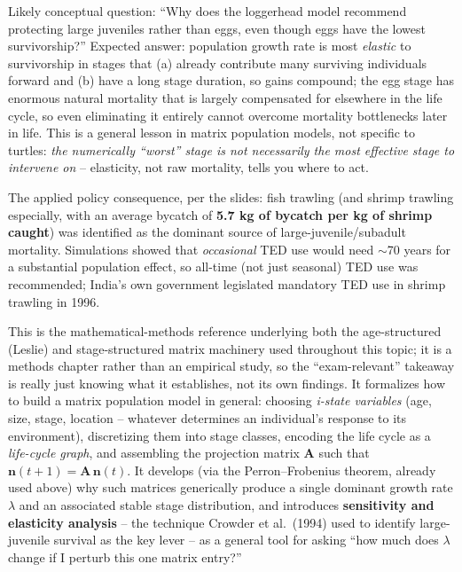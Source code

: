 \documentclass[11pt,a4paper]{article}
\begin{document}
\begin{exambox}
Likely conceptual question: ``Why does the loggerhead model recommend protecting large juveniles rather than eggs, even though eggs have the lowest survivorship?'' Expected answer: population growth rate is most \emph{elastic} to survivorship in stages that (a) already contribute many surviving individuals forward and (b) have a long stage duration, so gains compound; the egg stage has enormous natural mortality that is largely compensated for elsewhere in the life cycle, so even eliminating it entirely cannot overcome mortality bottlenecks later in life. This is a general lesson in matrix population models, not specific to turtles: \emph{the numerically ``worst'' stage is not necessarily the most effective stage to intervene on} -- elasticity, not raw mortality, tells you where to act.
\end{exambox}

The applied policy consequence, per the slides: fish trawling (and shrimp trawling especially, with an average bycatch of \textbf{5.7 kg of bycatch per kg of shrimp caught}) was identified as the dominant source of large-juvenile/subadult mortality. Simulations showed that \emph{occasional} TED use would need $\sim$70 years for a substantial population effect, so all-time (not just seasonal) TED use was recommended; India's own government legislated mandatory TED use in shrimp trawling in 1996.

\begin{papbox}[title={Paper Summary: Caswell (1997), \textit{Matrix Methods for Population Analysis} (Ch.\ 2 in Tuljapurkar \& Caswell, \textit{Structured-Population Models in Marine, Terrestrial and Freshwater Systems})}]
\label{sec:caswell-summary}
This is the mathematical-methods reference underlying both the age-structured (Leslie) and stage-structured matrix machinery used throughout this topic; it is a methods chapter rather than an empirical study, so the ``exam-relevant'' takeaway is really just knowing what it establishes, not its own findings. It formalizes how to build a matrix population model in general: choosing \emph{i-state variables} (age, size, stage, location -- whatever determines an individual's response to its environment), discretizing them into stage classes, encoding the life cycle as a \emph{life-cycle graph}, and assembling the projection matrix $\mathbf{A}$ such that $\mathbf{n}(t+1) = \mathbf{A}\,\mathbf{n}(t)$. It develops (via the Perron--Frobenius theorem, already used above) why such matrices generically produce a single dominant growth rate $\lambda$ and an associated stable stage distribution, and introduces \textbf{sensitivity and elasticity analysis} -- the technique Crowder et al.\ (1994) used to identify large-juvenile survival as the key lever -- as a general tool for asking ``how much does $\lambda$ change if I perturb this one matrix entry?''
\end{papbox}
\end{document}
